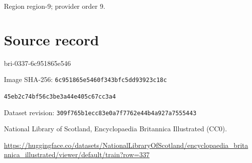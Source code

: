 \documentclass[11pt]{article}
\begin{document}
{\scriptsize\color{gray} Region region-9; provider order 9.\par}
\medskip
\newpage\section*{Source record}
bri-0337-6c951865e546\par
Image SHA-256: \texttt{6c951865e5460f343bfc5dd93923c18c}\par\texttt{45eb2c74bf56c3be3a44e405c67cc3a4}\par
Dataset revision: \texttt{309f765b1ecc83e0a7f7}\texttt{762e44b4a927a7555443}\par
National Library of Scotland, Encyclopaedia Britannica Illustrated (CC0).\par
\url{https://huggingface.co/datasets/NationalLibraryOfScotland/encyclopaedia_britannica_illustrated/viewer/default/train?row=337}
\end{document}

